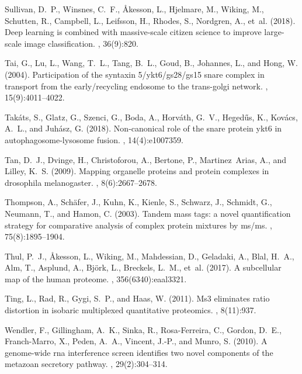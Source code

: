 \documentclass[12pt,english]{article}
\begin{document}
\begin{thebibliography}{}
Sullivan, D.~P., Winsnes, C.~F., {\AA}kesson, L., Hjelmare, M., Wiking, M.,
  Schutten, R., Campbell, L., Leifsson, H., Rhodes, S., Nordgren, A., et~al.
  (2018).
\newblock Deep learning is combined with massive-scale citizen science to
  improve large-scale image classification.
, 36(9):820.

Tai, G., Lu, L., Wang, T.~L., Tang, B.~L., Goud, B., Johannes, L., and Hong, W.
  (2004).
\newblock Participation of the syntaxin 5/ykt6/gs28/gs15 snare complex in
  transport from the early/recycling endosome to the trans-golgi network.
, 15(9):4011--4022.

Tak{\'a}ts, S., Glatz, G., Szenci, G., Boda, A., Horv{\'a}th, G.~V.,
  Heged{\H{u}}s, K., Kov{\'a}cs, A.~L., and Juh{\'a}sz, G. (2018).
\newblock Non-canonical role of the snare protein ykt6 in
  autophagosome-lysosome fusion.
, 14(4):e1007359.

Tan, D.~J., Dvinge, H., Christoforou, A., Bertone, P., Martinez~Arias, A., and
  Lilley, K.~S. (2009).
\newblock Mapping organelle proteins and protein complexes in drosophila
  melanogaster.
, 8(6):2667--2678.

Thompson, A., Sch{\"a}fer, J., Kuhn, K., Kienle, S., Schwarz, J., Schmidt, G.,
  Neumann, T., and Hamon, C. (2003).
\newblock Tandem mass tags: a novel quantification strategy for comparative
  analysis of complex protein mixtures by ms/ms.
, 75(8):1895--1904.

Thul, P.~J., {\AA}kesson, L., Wiking, M., Mahdessian, D., Geladaki, A., Blal,
  H.~A., Alm, T., Asplund, A., Bj{\"o}rk, L., Breckels, L.~M., et~al. (2017).
\newblock A subcellular map of the human proteome.
, 356(6340):eaal3321.

Ting, L., Rad, R., Gygi, S.~P., and Haas, W. (2011).
\newblock Ms3 eliminates ratio distortion in isobaric multiplexed quantitative
  proteomics.
, 8(11):937.

Wendler, F., Gillingham, A.~K., Sinka, R., Rosa-Ferreira, C., Gordon, D.~E.,
  Franch-Marro, X., Peden, A.~A., Vincent, J.-P., and Munro, S. (2010).
\newblock A genome-wide rna interference screen identifies two novel components
  of the metazoan secretory pathway.
, 29(2):304--314.


\end{thebibliography}
\end{document}
